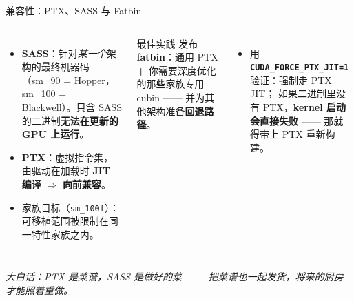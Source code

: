 \documentclass[aspectratio=169]{beamer}
\newcommand{\kw}[1]{\textbf{\textcolor{kwblue}{#1}}}
\newcommand{\pe}[1]{{\footnotesize\itshape 大白话：#1}}
\begin{document}
\begin{frame}{兼容性：PTX、SASS 与 Fatbin}
  \begin{columns}[t]
    \begin{itemize}
      \item \kw{SASS}：针对\emph{某一个}架构的最终机器码（sm\_90 = Hopper，
            sm\_100 = Blackwell）。只含 SASS 的二进制\kw{无法在更新的 GPU 上运行}。
      \item \kw{PTX}：虚拟指令集，由驱动在加载时 \kw{JIT 编译} $\Rightarrow$
            \kw{向前兼容}。
      \item 家族目标（\texttt{sm\_100f}）：可移植范围被限制在同一特性家族之内。
    \end{itemize}
    \begin{block}{最佳实践}
      \small 发布 \kw{fatbin}：通用 PTX \kw{+} 你需要深度优化的那些家族专用 cubin
      —— 并为其他架构准备\kw{回退路径}。
    \end{block}
    \begin{itemize}\small
      \item 用 \kw{\texttt{CUDA\_FORCE\_PTX\_JIT=1}} 验证：强制走 PTX JIT；
            如果二进制里没有 PTX，\kw{kernel 启动会直接失败} —— 那就得带上 PTX 重新构建。
    \end{itemize}
  \end{columns}
  \medskip
  \pe{PTX 是菜谱，SASS 是做好的菜 —— 把菜谱也一起发货，将来的厨房才能照着重做。}
\end{frame}
\end{document}
